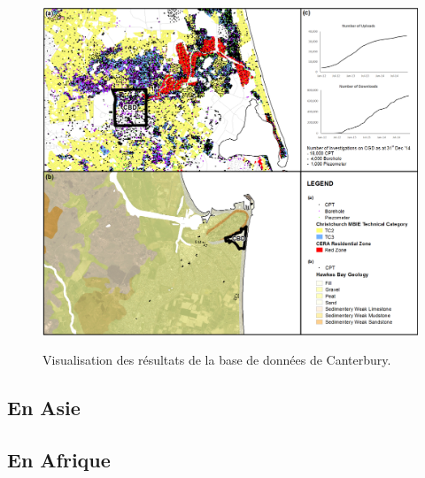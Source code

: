        
        \begin{figure}[t]
        \centering
        \includegraphics[width=1\textwidth]{cgd.png}
        \label{image-cdg}
        \caption{Visualisation des résultats de la base de données de Canterbury.}
        \end{figure}
        \subsection{En Asie}
         \paragraph{}

         \subsection{En Afrique}
